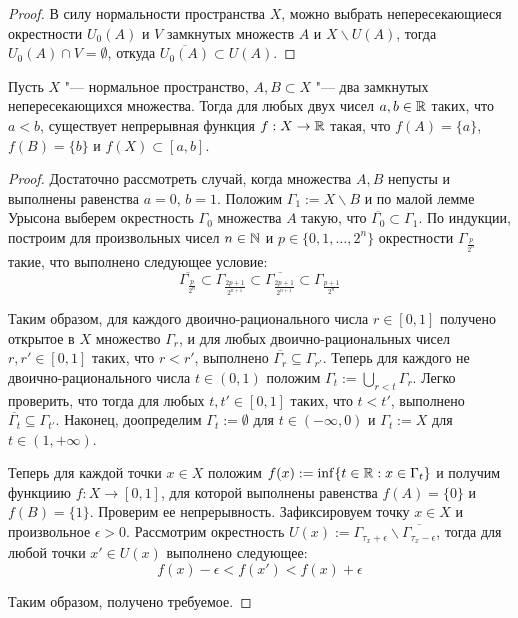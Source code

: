 \begin{proof}
    В силу нормальности пространства $X$, можно выбрать непересекающиеся окрестности $U_0(A)$ и $V$ замкнутых множеств $A$ и $X \backslash U(A)$, тогда $U_0(A) \cap V = \emptyset$, откуда $\overline{U_0(A)} \subset U(A)$.
\end{proof}

\begin{proposition}
    Пусть $X$ "--- нормальное пространство, $A, B \subset X$ "--- два замкнутых  непересекающихся множества. Тогда для любых двух чисел $a, b \in \mathbb{R}$ таких, что $a < b$, существует непрерывная функция $f: X \to \mathbb{R}$ такая, что $f(A) = \{a\}$, $f(B) = \{b\}$ и $f(X) \subset [a, b]$.
\end{proposition}

\begin{proof}
    Достаточно рассмотреть случай, когда множества $A, B$ непусты и выполнены равенства $a = 0$, $b = 1$. Положим $\Gamma_1 :=  X \backslash B$ и по малой лемме Урысона выберем окрестность $\Gamma_0$ множества $A$ такую, что $\overline{\Gamma_0} \subset \Gamma_1$. По индукции, построим для произвольных чисел $n \in \mathbb{N}$ и $p \in \{0, 1, \dotsc, 2^n\}$ окрестности $\Gamma_{\frac{p}{2^n}}$ такие, что выполнено следующее условие:
    \[\overline{\Gamma_{\frac{p}{2^n}}} \subset \Gamma_{\frac{2p+1}{2^{n+1}}}\subset \overline{\Gamma_{\frac{2p+1}{2^{n+1}}}}\subset \Gamma_{\frac{p+1}{2^n}}\]

    Таким образом, для каждого двоично-рационального числа $r \in [0, 1]$ получено открытое в $X$ множество $\Gamma_r$, и для любых двоично-рациональных чисел $r, r' \in [0, 1]$ таких, что $r < r'$, выполнено $\overline{\Gamma_r} \subseteq \Gamma_{r'}$. Теперь для каждого не двоично-рационального числа $t \in (0, 1)$ положим $\Gamma_t := \bigcup_{r<t}\Gamma_r$. Легко проверить, что тогда для любых $t, t' \in [0, 1]$ таких, что $t < t'$, выполнено $\overline{\Gamma_t} \subseteq \Gamma_{t'}$. Наконец, доопределим $\Gamma_t := \emptyset$ для $t \in (-\infty, 0)$ и $\Gamma_t := X$ для $t \in (1, +\infty)$.
    
    Теперь для каждой точки $x \in X$ положим $f(x) := \inf\{t \in \mathbb{R}: x \in \Gamma_t\}$ и получим функциию $f: X \to [0, 1]$, для которой выполнены равенства $f(A) = \{0\}$ и $f(B) = \{1\}$. Проверим ее непрерывность. Зафиксировуем точку $x \in X$ и произвольное $\epsilon > 0$. Рассмотрим окрестность $U(x) := \Gamma_{\tau_x + \epsilon}\backslash \overline{\Gamma_{\tau_x - \epsilon}}$, тогда для любой точки $x'\in U(x)$ выполнено следующее:
    \[f(x) - \epsilon< f(x') <f(x) +\epsilon\]

    Таким образом, получено требуемое.
\end{proof}

